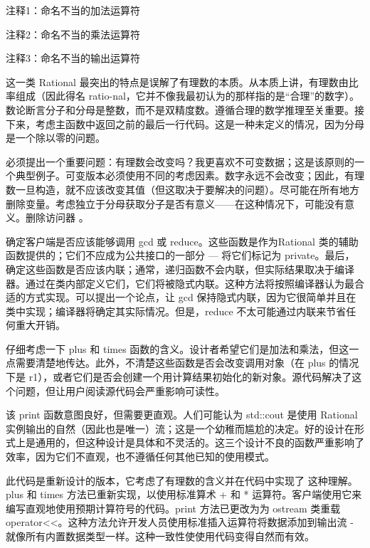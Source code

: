 {\footnotesize
注释1：命名不当的加法运算符

注释2：命名不当的乘法运算符

注释3：命名不当的输出运算符
}


这一类 Rational 最突出的特点是误解了有理数的本质。从本质上讲，有理数由比率组成（因此得名 ratio-nal，它并不像我最初认为的那样指的是“合理”的数字）。数论断言分子和分母是整数，而不是双精度数。遵循合理的数学推理至关重要。接下来，考虑主函数中返回之前的最后一行代码。这是一种未定义的情况，因为分母是一个除以零的问题。

必须提出一个重要问题：有理数会改变吗？我更喜欢不可变数据；这是该原则的一个典型例子。可变版本必须使用不同的考虑因素。数字永远不会改变；因此，有理数一旦构造，就不应该改变其值（但这取决于要解决的问题）。尽可能在所有地方删除变量。考虑独立于分母获取分子是否有意义——在这种情况下，可能没有意义。删除访问器 。

确定客户端是否应该能够调用 gcd 或 reduce。这些函数是作为Rational 类的辅助函数提供的；它们不应成为公共接口的一部分 — 将它们标记为 private。最后，确定这些函数是否应该内联；通常，递归函数不会内联，但实际结果取决于编译器。通过在类内部定义它们，它们将被隐式内联。这种方法将按照编译器认为最合适的方式实现。可以提出一个论点，让 gcd 保持隐式内联，因为它很简单并且在类中实现；编译器将确定其实际情况。但是，reduce 不太可能通过内联来节省任何重大开销。

仔细考虑一下 plus 和 times 函数的含义。设计者希望它们是加法和乘法，但这一点需要清楚地传达。此外，不清楚这些函数是否会改变调用对象（在 plus 的情况下是 r1），或者它们是否会创建一个用计算结果初始化的新对象。源代码解决了这个问题，但让用户阅读源代码会严重影响可读性。

该 print 函数意图良好，但需要更直观。人们可能认为 std::cout 是使用 Rational 实例输出的自然（因此也是唯一）流；这是一个幼稚而尴尬的决定。好的设计在形式上是通用的，但这种设计是具体和不灵活的。这三个设计不良的函数严重影响了效率，因为它们不直观，也不遵循任何其他已知的使用模式。


此代码是重新设计的版本，它考虑了有理数的含义并在代码中实现了 这种理解。plus 和 times 方法已重新实现，以使用标准算术 + 和 * 运算符。客户端使用它来编写直观地使用预期计算符号的代码。print 方法已更改为为 ostream 类重载 operator<{}<。这种方法允许开发人员使用标准插入运算符将数据添加到输出流 - 就像所有内置数据类型一样。这种一致性使使用代码变得自然而有效。


